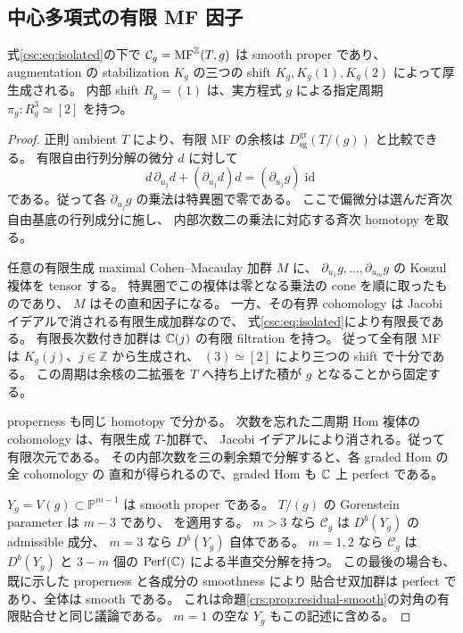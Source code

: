 \subsection{中心多項式の有限 MF 因子}

\begin{lemma}[孤立三次の中心因子]
\label{csc:lem:central-factor}
式\eqref{csc:eq:isolated}の下で
$\mathcal C_g=\operatorname{MF}^{\mathbb Z}(T,g)$ は smooth proper であり、
augmentation の stabilization $K_g$ の三つの shift
$K_g,K_g(1),K_g(2)$ によって厚生成される。
内部 shift $R_g=(1)$ は、実方程式 $g$ による指定周期
$\pi_g:R_g^3\simeq[2]$ を持つ。
\end{lemma}
\begin{proof}
正則 ambient $T$ により、有限 MF の余核は
$D^{\mathrm{gr}}_{\mathrm{sg}}(T/(g))$ と比較できる。
有限自由行列分解の微分 $d$ に対して
\[
 d\,\partial_{u_j}d+(\partial_{u_j}d)d
      =(\partial_{u_j}g)\operatorname{id}
\]
である。従って各 $\partial_{u_j}g$ の乗法は特異圏で零である。
ここで偏微分は選んだ斉次自由基底の行列成分に施し、
内部次数二の乗法に対応する斉次 homotopy を取る。

任意の有限生成 maximal Cohen--Macaulay 加群 $M$ に、
$\partial_{u_1}g,\ldots,\partial_{u_m}g$ の Koszul 複体を tensor する。
特異圏でこの複体は零となる乗法の cone を順に取ったものであり、
$M$ はその直和因子になる。
一方、その有界 cohomology は Jacobi イデアルで消される有限生成加群なので、
式\eqref{csc:eq:isolated}により有限長である。
有限長次数付き加群は $\mathbb C(j)$ の有限 filtration を持つ。
従って全有限 MF は $K_g(j)$、$j\in\mathbb Z$ から生成され、
$(3)\simeq[2]$ により三つの shift で十分である。
この周期は余核の二拡張を $T$ へ持ち上げた積が $g$ となることから固定する。

properness も同じ homotopy で分かる。
次数を忘れた二周期 Hom 複体の cohomology は、有限生成 $T$-加群で、
Jacobi イデアルにより消される。従って有限次元である。
その内部次数を三の剰余類で分解すると、各 graded Hom の全 cohomology の
直和が得られるので、graded Hom も $\mathbb C$ 上 perfect である。

$Y_g=V(g)\subset\mathbb P^{m-1}$ は smooth proper である。
$T/(g)$ の Gorenstein parameter は $m-3$ であり、
\cite[Theorem~6.4]{LP-BS}を適用する。
$m>3$ なら $\mathcal C_g$ は $D^b(Y_g)$ の admissible 成分、
$m=3$ なら $D^b(Y_g)$ 自体である。
$m=1,2$ なら $\mathcal C_g$ は $D^b(Y_g)$ と $3-m$ 個の
$\operatorname{Perf}(\mathbb C)$ による半直交分解を持つ。
この最後の場合も、既に示した properness と各成分の smoothness により
貼合せ双加群は perfect であり、全体は smooth である。
これは命題\ref{crs:prop:residual-smooth}の対角の有限貼合せと同じ議論である。
$m=1$ の空な $Y_g$ もこの記述に含める。
\end{proof}

